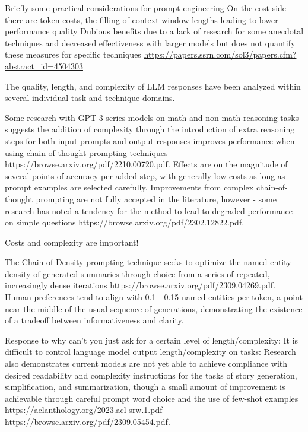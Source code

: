 \documentclass[11pt]{article}
\begin{document}
Briefly some practical considerations for prompt engineering 
On the cost side there are token costs, the filling of context window lengths leading to lower performance quality
Dubious benefits due to a lack of research for some anecdotal techniques and decreased effectiveness with larger models
but does not quantify these measures for specific techniques
\url{https://papers.ssrn.com/sol3/papers.cfm?abstract_id=4504303}

The quality, length, and complexity of LLM responses have been analyzed within several individual task and technique domains. 

Some research with GPT-3 series models on math and non-math reasoning tasks suggests the addition of complexity through the introduction of extra reasoning steps for both input prompts and output responses improves performance when using chain-of-thought prompting techniques https://browse.arxiv.org/pdf/2210.00720.pdf. Effects are on the magnitude of several points of accuracy per added step, with generally low costs as long as prompt examples are selected carefully. Improvements from complex chain-of-thought prompting are not fully accepted in the literature, however - some research has noted a tendency for the method to lead to degraded performance on simple questions https://browse.arxiv.org/pdf/2302.12822.pdf.

Costs and complexity are important!

The Chain of Density prompting technique seeks to optimize the named entity density of generated summaries through choice from a series of repeated, increasingly dense iterations https://browse.arxiv.org/pdf/2309.04269.pdf. Human preferences tend to align with 0.1 - 0.15 named entities per token, a point near the middle of the usual sequence of generations, demonstrating the existence of a tradeoff between informativeness and clarity.

Response to why can't you just ask for a certain level of length/complexity:
It is difficult to control language model output length/complexity on tasks:
Research also demonstrates current models are not yet able to achieve compliance with desired readability and complexity instructions for the tasks of story generation, simplification, and summarization, though a small amount of improvement is achievable through careful prompt word choice and the use of few-shot examples https://aclanthology.org/2023.acl-srw.1.pdf https://browse.arxiv.org/pdf/2309.05454.pdf.
\end{document}
